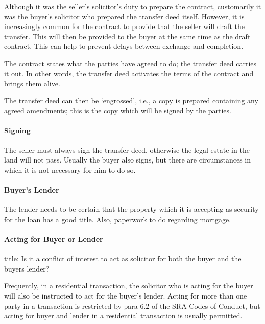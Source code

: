 \documentclass[
]{article}
\newenvironment{Shaded}{}{}
\newcommand{\NormalTok}[1]{#1}
\begin{document}
Although it was the seller's solicitor's duty to prepare the contract,
customarily it was the buyer's solicitor who prepared the transfer deed
itself. However, it is increasingly common for the contract to provide
that the seller will draft the transfer. This will then be provided to
the buyer at the same time as the draft contract. This can help to
prevent delays between exchange and completion.

\begin{Shaded}
\begin{Highlighting}[]
\NormalTok{The contract states what the parties have agreed to do; the transfer deed}
\NormalTok{carries it out. In other words, the transfer deed activates the terms of the contract and brings}
\NormalTok{them alive.}
\end{Highlighting}
\end{Shaded}

The transfer deed can then be `engrossed', i.e., a copy is prepared
containing any agreed amendments; this is the copy which will be signed
by the parties.

\hypertarget{signing}{%
\paragraph{Signing}\label{signing}}

The seller must always sign the transfer deed, otherwise the legal
estate in the land will not pass. Usually the buyer also signs, but
there are circumstances in which it is not necessary for him to do so.

\hypertarget{buyers-lender}{%
\paragraph{Buyer's Lender}\label{buyers-lender}}

The lender needs to be certain that the property which it is accepting
as security for the loan has a good title. Also, paperwork to do
regarding mortgage.

\hypertarget{acting-for-buyer-or-lender}{%
\paragraph{Acting for Buyer or
Lender}\label{acting-for-buyer-or-lender}}

\begin{Shaded}
\begin{Highlighting}[]
\NormalTok{title: Is it a conflict of interest to act as solicitor for both the buyer and the buyer\textquotesingle{}s lender?}

\NormalTok{Frequently, in a residential transaction, the solicitor who is acting for the buyer will also be instructed to act for the buyer’s lender. Acting for more than one party in a transaction is restricted by para 6.2 of the SRA Codes of Conduct, but acting for buyer and lender in a residential transaction is usually  permitted.}
\end{Highlighting}
\end{Shaded}
\end{document}
